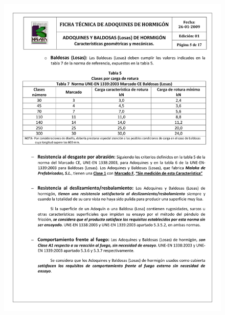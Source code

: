 \begin{figure}[!htb]
\centering
\includegraphics[scale=0.68]{ficha_tecnica/ft_adoquin_5.pdf}
\label{fig:ftadoquin5}
\end{figure}
\newpage
